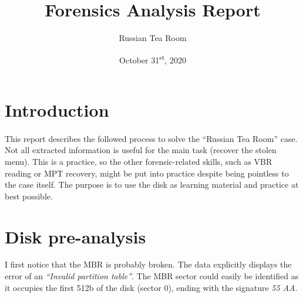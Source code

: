 \documentclass[
	12pt, %
]{fphw}
\title{Forensics Analysis Report} %
\author{Russian Tea Room} %
\date{October 31\textsuperscript{st}, 2020} %
\institute{Computer Forensic Reference Data Sets (CFReDS)} %
\begin{document}
\maketitle %



\paragraph{}
\section*{Introduction}
\label{sec:intro}

\paragraph{}
This report describes the followed process to solve the “Russian Tea Room” case. Not all extracted information is useful for the main task (recover the stolen menu). This is a practice, so the other forensic-related skills, such as VBR reading or MPT recovery, might be put into practice despite being pointless to the case itself. The purpose is to use the disk as learning material and practice at best possible.\\


\section{Disk pre-analysis}
\label{sec:docs}

I first notice that the MBR is probably broken. The data explicitly displays the error of an \textit{“Invalid
partition table”}. The MBR sector could easily be identified as it occupies the first 512b of the disk
(sector 0), ending with the signature \textit{55 AA}.
\end{document}
